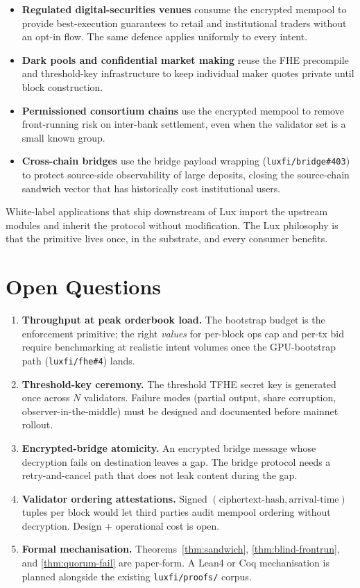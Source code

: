 \documentclass[11pt,a4paper]{article}
\begin{document}
\begin{itemize}[nosep]
\item \textbf{Regulated digital-securities venues} consume the
  encrypted mempool to provide best-execution guarantees to
  retail and institutional traders without an opt-in flow. The
  same defence applies uniformly to every intent.
\item \textbf{Dark pools and confidential market making} reuse
  the FHE precompile and threshold-key infrastructure to keep
  individual maker quotes private until block construction.
\item \textbf{Permissioned consortium chains} use the encrypted
  mempool to remove front-running risk on inter-bank settlement,
  even when the validator set is a small known group.
\item \textbf{Cross-chain bridges} use the bridge payload
  wrapping (\texttt{luxfi/bridge\#403}) to protect source-side
  observability of large deposits, closing the source-chain
  sandwich vector that has historically cost institutional users.
\end{itemize}

White-label applications that ship downstream of Lux import the
upstream modules and inherit the protocol without modification. The
Lux philosophy is that the primitive lives once, in the substrate,
and every consumer benefits.

\section{Open Questions}

\begin{enumerate}[label=\arabic*.]
\item \textbf{Throughput at peak orderbook load.} The bootstrap
  budget is the enforcement primitive; the right \emph{values}
  for per-block ops cap and per-tx bid require benchmarking at
  realistic intent volumes once the GPU-bootstrap path
  (\texttt{luxfi/fhe\#4}) lands.
\item \textbf{Threshold-key ceremony.} The threshold TFHE secret
  key is generated once across $N$ validators. Failure modes
  (partial output, share corruption, observer-in-the-middle)
  must be designed and documented before mainnet rollout.
\item \textbf{Encrypted-bridge atomicity.} An encrypted bridge
  message whose decryption fails on destination leaves a gap.
  The bridge protocol needs a retry-and-cancel path that does
  not leak content during the gap.
\item \textbf{Validator ordering attestations.} Signed
  $(\text{ciphertext-hash}, \text{arrival-time})$ tuples per
  block would let third parties audit mempool ordering without
  decryption. Design + operational cost is open.
\item \textbf{Formal mechanisation.}
  Theorems~\ref{thm:sandwich}, \ref{thm:blind-frontrun}, and
  \ref{thm:quorum-fail} are paper-form. A Lean4 or Coq
  mechanisation is planned alongside the existing
  \texttt{luxfi/proofs/} corpus.
\end{enumerate}
\end{document}
